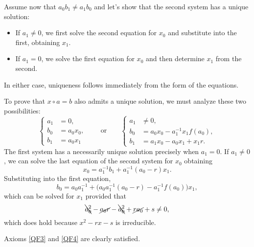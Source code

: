 \begin{xmpl}
    Assume now that $a_0b_1 \ne a_1b_0$ and let's show that the second system has a unique solution:
    \begin{itemize}
        \item If $a_1 \ne 0$, we first solve the second equation for $x_0$ and substitute into the first, obtaining $x_1$.
        \item If $a_1 = 0$, we solve the first equation for $x_0$ and then determine $x_1$ from the second.
    \end{itemize}
    In either case, uniqueness follows immediately from the form of the equations.

    To prove that $x\circ a=b$ also admits a unique solution, we must analyze these two possibilities:
    \[
        \left\{\begin{aligned}
            a_1 &= 0,\\
            b_0 &= a_0x_0,\\
            b_1 &= a_0x_1
        \end{aligned}\right.
        \qquad\text{or}\qquad
        \left\{\begin{aligned}
            a_1 &\ne 0,\\
            b_0 &= a_0x_0 - a_1^{-1}x_1f(a_0),\\
            b_1 &= a_1x_0 - a_0x_1 + x_1r.
        \end{aligned}\right.
    \]
    The first system has a necessarily unique solution precisely when $a_1=0$. If $a_1\ne0$, we can solve the last equation of the second system for $x_0$ obtaining
    \[
        x_0=a_1^{-1}b_1+a_1^{-1}(a_0-r)x_1.
    \]
    Substituting into the first equation,
    \[
        b_0=a_0a_1^{-1}+\big(a_0a_1^{-1}(a_0-r)-a_1^{-1}f(a_0)\big)x_1,
    \]
    which can be solved for $x_1$ provided that
    \[
        \bcancel{a_0^2}-\cancel{a_0r}-\bcancel{a_0^2}+\cancel{ra_0}
            +s\ne0,
    \]
    which does hold because $x^2-rx-s$ is irreducible.

    Axioms \textsc{\ref{QF3}} and \textsc{\ref{QF4}} are clearly satisfied.


\end{xmpl}
